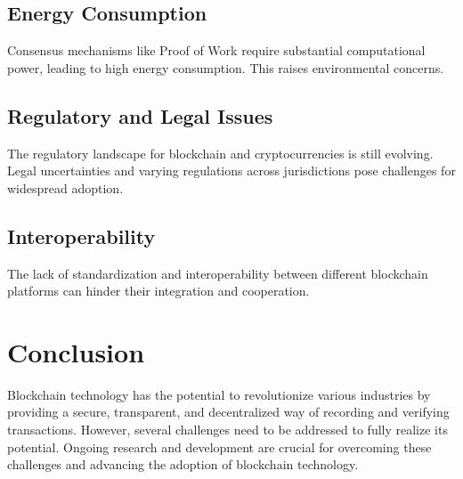 \documentclass[12pt]{article}
\begin{document}
\subsection{Energy Consumption}
Consensus mechanisms like Proof of Work require substantial computational power, leading to high energy consumption. This raises environmental concerns.

\subsection{Regulatory and Legal Issues}
The regulatory landscape for blockchain and cryptocurrencies is still evolving. Legal uncertainties and varying regulations across jurisdictions pose challenges for widespread adoption.

\subsection{Interoperability}
The lack of standardization and interoperability between different blockchain platforms can hinder their integration and cooperation.

\section{Conclusion}
Blockchain technology has the potential to revolutionize various industries by providing a secure, transparent, and decentralized way of recording and verifying transactions. However, several challenges need to be addressed to fully realize its potential. Ongoing research and development are crucial for overcoming these challenges and advancing the adoption of blockchain technology.



\end{document}
